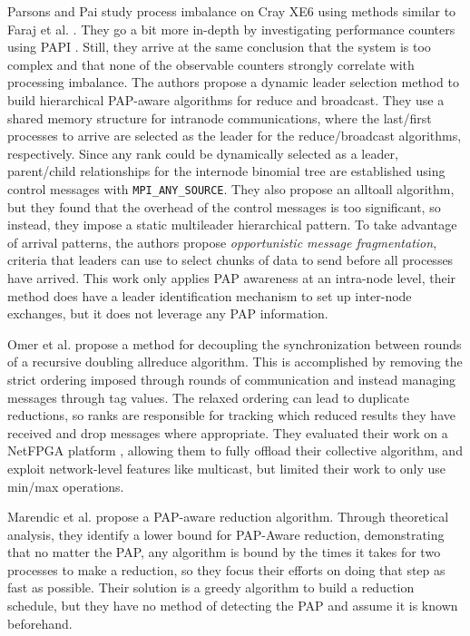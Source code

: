 Parsons and Pai \cite{Parsons2015ExpProcImbMPICollHierarcialSys} study process imbalance on Cray XE6 using methods similar to Faraj et al. \cite{Faraj2008StudyProcArrivalMPIColl}.
They go a bit more in-depth by investigating performance counters using PAPI \cite{Mucci1999PAPI}. 
Still, they arrive at the same conclusion that the system is too complex and that none of the observable counters strongly correlate with processing imbalance. 
The authors propose a dynamic leader selection method to build hierarchical \gls{PAP}-aware algorithms for reduce and broadcast.
They use a shared memory structure for intranode communications, where the last/first processes to arrive are selected as the leader for the reduce/broadcast algorithms, respectively. 
Since any rank could be dynamically selected as a leader, parent/child relationships for the internode binomial tree are established using control messages with \texttt{MPI\_ANY\_SOURCE}. 
They also propose an alltoall algorithm, but they found that the overhead of the control messages is too significant, so instead, they impose a static multileader hierarchical pattern.
To take advantage of arrival patterns, the authors propose \textit{opportunistic message fragmentation}, criteria that leaders can use to select chunks of data to send before all processes have arrived.
This work only applies \gls{PAP} awareness at an intra-node level, their method does have a leader identification mechanism to set up inter-node exchanges, but it does not leverage any \gls{PAP} information.

Omer et al. \cite{Arap2015AdaptiveRDForCC} propose a method for decoupling the synchronization between rounds of a recursive doubling allreduce algorithm. 
This is accomplished by removing the strict ordering imposed through rounds of communication and instead managing messages through tag values.
The relaxed ordering can lead to duplicate reductions, so ranks are responsible for tracking which reduced results they have received and drop messages where appropriate. 
They evaluated their work on a NetFPGA platform \cite{Lockwood2007NetFPGA}, allowing them to fully offload their collective algorithm, and exploit network-level features like multicast, but limited their work to only use min/max operations.

Marendic et al. \cite{Marendic2016Clairvoyant} propose a \gls{PAP}-aware reduction algorithm.
Through theoretical analysis, they identify a lower bound for \gls{PAP}-Aware reduction, demonstrating that no matter the \gls{PAP}, any algorithm is bound by the times it takes for two processes to make a reduction, so they focus their efforts on doing that step as fast as possible. 
Their solution is a greedy algorithm to build a reduction schedule, but they have no method of detecting the \gls{PAP} and assume it is known beforehand.

